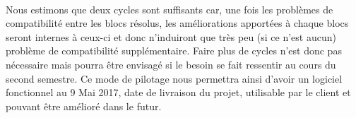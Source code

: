 \paragraph{}

Nous estimons que deux cycles sont suffisants car, une fois les problèmes de compatibilité entre les blocs résolus, les améliorations apportées à chaque blocs seront internes à ceux-ci et donc n’induiront que très peu (si ce n’est aucun) problème de compatibilité supplémentaire. Faire plus de cycles n’est donc pas nécessaire mais pourra être envisagé si le besoin se fait ressentir au cours du second semestre. Ce mode de pilotage nous permettra ainsi d’avoir un logiciel fonctionnel au 9 Mai 2017, date de livraison du projet, utilisable par le client et pouvant être amélioré dans le futur.















